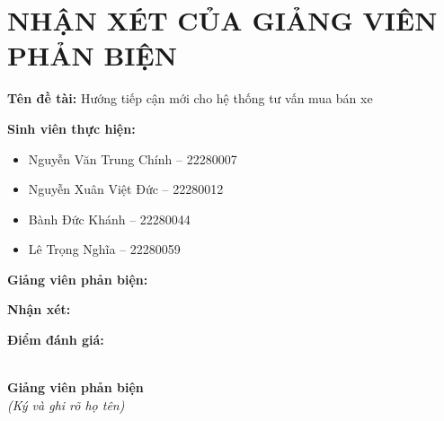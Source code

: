 \clearpage
\chapter*{\centering NHẬN XÉT CỦA GIẢNG VIÊN PHẢN BIỆN}

\vspace{0.5cm}

\noindent\textbf{Tên đề tài:} Hướng tiếp cận mới cho hệ thống tư vấn mua bán xe

\noindent\textbf{Sinh viên thực hiện:}
\begin{itemize}[noitemsep]
  \item Nguyễn Văn Trung Chính -- 22280007
  \item Nguyễn Xuân Việt Đức -- 22280012
  \item Bành Đức Khánh -- 22280044
  \item Lê Trọng Nghĩa -- 22280059
\end{itemize}

\noindent\textbf{Giảng viên phản biện:} \dotfill

\vspace{0.5cm}

\noindent\textbf{Nhận xét:}

\vspace{0.3cm}
\noindent\dotfill

\noindent\dotfill

\noindent\dotfill

\noindent\dotfill

\noindent\dotfill

\noindent\dotfill

\noindent\dotfill

\noindent\dotfill

\noindent\dotfill

\noindent\dotfill

\noindent\dotfill

\noindent\dotfill

\noindent\dotfill

\noindent\dotfill

\noindent\dotfill

\vspace{0.5cm}
\noindent\textbf{Điểm đánh giá:} \dotfill

\vspace{1.5cm}

\begin{flushright}
\\[0.3cm]
\textbf{Giảng viên phản biện}\\[0.3cm]
\textit{(Ký và ghi rõ họ tên)}\\[3cm]
\end{flushright}
